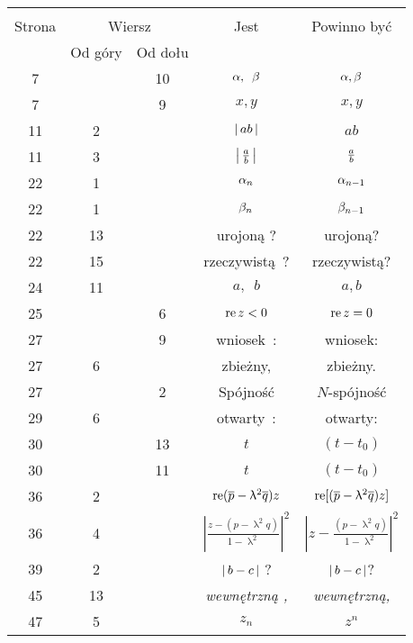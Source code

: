 \documentclass[a4paper,11pt]{article}
\begin{document}
\vspace{\spaceFour}


\begin{center}
  \begin{tabular}{|c|c|c|c|c|}
    \hline
    & \multicolumn{2}{c|}{} & & \\
    Strona & \multicolumn{2}{c|}{Wiersz} & Jest
                              & Powinno być \\ \cline{2-3}
    & Od góry & Od dołu & & \\
    \hline
    7   & & 10 & $\alpha,\:\; \beta$ & $\alpha, \beta$ \\
    7   & &  9 & $x,\! y$ & $x, y$ \\
    11  &  2 & & $\left| \,  a b  \, \right|$ & $ab$ \\
    11  &  3 & & $\left| \,  \tfrac{ a }{ b }  \, \right|$ & $\tfrac{ a }{ b }$ \\
    22  &  1 & & $\alpha_{ n }$ & $\alpha_{ n - 1 }$ \\
    22  &  1 & & $\beta_{ n }$ & $\beta_{ n - 1 }$ \\
    22  & 13 & & urojoną ? & urojoną? \\
    22  & 15 & & rzeczywistą~? & rzeczywistą? \\
    24  & 11 & & $a, \:\; b$ & $a, b$ \\
    25  & &  6 & $\textrm{re}\, z < 0$ & $\textrm{re}\, z = 0$ \\
    27  & &  9 & wniosek~: & wniosek: \\
    27  &  6 & & zbieżny, & zbieżny. \\
    27  & &  2 & Spójność & $N$-spójność \\
    29  &  6 & & otwarty~: & otwarty: \\
    30  & & 13 & $t$ & $( t - t_{ 0 } )$ \\
    30  & & 11 & $t$ & $( t - t_{ 0 } )$ \\
    36  &  2 & & $\textrm{re}( \overline{ p } - \uplambda^{ 2 } \overline{ q } ) z$
           & $\textrm{re}[( \overline{ p } - \uplambda^{ 2 } \overline{ q } ) z]$ \\
    36  &  4 & & $\left| \frac{ z - ( p - \uplambda^{ 2 } q) }{ 1
                 - \uplambda^{ 2 } } \right|^{ 2 }$
           & $\left| z - \frac{ ( p - \uplambda^{ 2 } q) }{ 1
             - \uplambda^{ 2 } } \right|^{ 2 }$ \\
    39  &  2 & & $\left| \,  b - c  \, \right|$ ? & $\left| \,  b - c  \, \right|$? \\
    45  & 13 & & \emph{wewnętrzną ,} & \emph{wewnętrzną,} \\
    47  &  5 & & $z_{ n }$ & $z^{ n }$ \\

\end{tabular}
\end{center}
\end{document}
